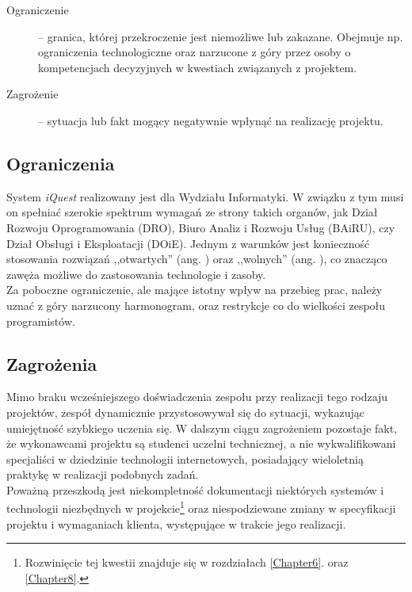 \begin{description}
\item[Ograniczenie] -- granica, której przekroczenie jest niemożliwe lub zakazane. Obejmuje np. ograniczenia technologiczne oraz narzucone z góry przez osoby o kompetencjach decyzyjnych w kwestiach związanych z projektem.
\item[Zagrożenie] -- sytuacja lub fakt mogący negatywnie wpłynąć na realizację projektu.
\end{description}

\subsection{Ograniczenia}
\label{Chapter121}

System \textit{iQuest} realizowany jest dla Wydziału Informatyki. W związku z tym musi on spełniać szerokie spektrum wymagań ze strony takich organów, jak Dział Rozwoju Oprogramowania (DRO), Biuro Analiz i Rozwoju Usług (BAiRU), czy Dział Obsługi i Eksploatacji (DOiE). Jednym z warunków jest konieczność stosowania rozwiązań ,,otwartych'' (ang. ) oraz ,,wolnych'' (ang. ), co znacząco zawęża możliwe do zastosowania technologie i zasoby. \\

Za poboczne ograniczenie, ale mające istotny wpływ na przebieg prac, należy uznać z góry narzucony harmonogram, oraz restrykcje co do wielkości zespołu programistów.

\subsection{Zagrożenia}
\label{Chapter122}

Mimo braku wcześniejszego doświadczenia zespołu przy realizacji tego rodzaju projektów, zespół dynamicznie przystosowywał się do sytuacji, wykazując umiejętność szybkiego uczenia się. W dalszym ciągu zagrożeniem pozostaje fakt, że wykonawcami projektu są studenci uczelni technicznej, a nie wykwalifikowani specjaliści w dziedzinie technologii internetowych, posiadający wieloletnią praktykę w realizacji podobnych zadań. \\

Poważną przeszkodą jest niekompletność dokumentacji niektórych systemów i technologii niezbędnych w projekcie\footnote{Rozwinięcie tej kwestii znajduje się w rozdziałach \ref{Chapter6}. oraz \ref{Chapter8}.} oraz niespodziewane zmiany w specyfikacji projektu i wymaganiach klienta, występujące w trakcie jego realizacji.

